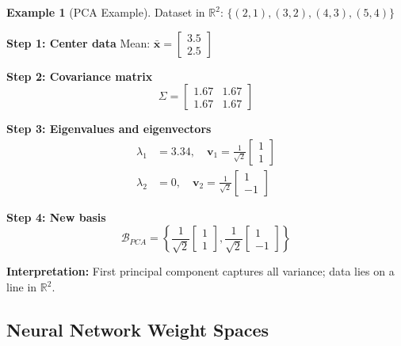 \documentclass[12pt,a4paper]{article}
\theoremstyle{definition}
\newtheorem{example}{Example}[section]
\begin{document}
\begin{example}[PCA Example]
Dataset in $\mathbb{R}^2$: $\{(2,1), (3,2), (4,3), (5,4)\}$

\textbf{Step 1: Center data}
Mean: $\bar{\mathbf{x}} = \begin{bmatrix} 3.5 \\ 2.5 \end{bmatrix}$

\textbf{Step 2: Covariance matrix}
\begin{equation}
\Sigma = \begin{bmatrix} 1.67 & 1.67 \\ 1.67 & 1.67 \end{bmatrix}
\end{equation}

\textbf{Step 3: Eigenvalues and eigenvectors}
\begin{align}
\lambda_1 &= 3.34, \quad \mathbf{v}_1 = \frac{1}{\sqrt{2}}\begin{bmatrix} 1 \\ 1 \end{bmatrix} \\
\lambda_2 &= 0, \quad \mathbf{v}_2 = \frac{1}{\sqrt{2}}\begin{bmatrix} 1 \\ -1 \end{bmatrix}
\end{align}

\textbf{Step 4: New basis}
\begin{equation}
\mathcal{B}_{PCA} = \left\{\frac{1}{\sqrt{2}}\begin{bmatrix} 1 \\ 1 \end{bmatrix}, \frac{1}{\sqrt{2}}\begin{bmatrix} 1 \\ -1 \end{bmatrix}\right\}
\end{equation}

\textbf{Interpretation:} First principal component captures all variance; data lies on a line in $\mathbb{R}^2$.
\end{example}

\subsection{Neural Network Weight Spaces}
\end{document}
